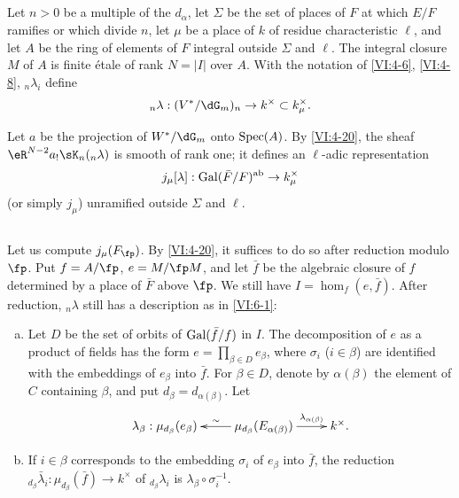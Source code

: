 \subsection{}\label{VI:6-2}

Let $n>0$ be a multiple of the $d_\alpha$, let $\Sigma$ be the set of places of $F$ 
at which $E/F$ ramifies or which divide $n$, let $\mu$ be a place of $k$ of 
residue characteristic $\ell$, and let $A$ be the ring of elements of $F$ 
integral outside $\Sigma$ and $\ell$. The integral closure $M$ of $A$ 
is finite étale of rank $N=|I|$ over $A$. With the notation of \ref{VI:4-6}, 
\ref{VI:4-8}, $_n \lambda_i$ define 
\[
  _n\lambda:(V^\ast/\dG_m)_n \to k^\times \subset k_\mu^\times \text{.} 
\]

Let $a$ be the projection of $W^\ast/\dG_m$ onto $\operatorname{Spec}(A)$. By 
\ref{VI:4-20}, the sheaf $\eR^{N-2} a_! \sK_n(_n \lambda)$ is smooth of rank 
one; it defines an $\ell$-adic representation 
\[
  j_\mu[\lambda]:\operatorname{Gal}(\bar F/F)^\text{ab} \to k_\mu^\times 
\]
  (or simply $j_\mu$) unramified outside $\Sigma$ and $\ell$. 





\subsection{}\label{VI:6-3}

Let us compute $j_\mu(F_\fp)$. By \ref{VI:4-20}, it suffices to do so 
after reduction modulo $\fp$. Put $f=A/\fp$, $e=M/\fp  M$, and let 
$\bar f$ be the algebraic closure of $f$ determined by a place of $\bar F$ 
above $\fp$. We still have $I=\hom_f(e,\bar f)$. After reduction, 
$_n\lambda$ still has a description as in \ref{VI:6-1}: 
\begin{enumerate}[a)]
  \item Let $D$ be the set of orbits of $\operatorname{Gal}(\bar f/f)$ in $I$. The 
    decomposition of $e$ as a product of fields has the form 
    $e=\prod_{\beta\in D} e_\beta$, where $\sigma_i$ ($i\in \beta$) 
    are identified with the embeddings of $e_\beta$ into $\bar f$. For $\beta\in D$, 
    denote by $\alpha(\beta)$ the element of $C$ containing $\beta$, and put 
    $d_\beta=d_{\alpha(\beta)}$. Let 
    \[\xymatrix{
      \lambda_\beta : \mu_{d_\beta}(e_\beta) 
        & \ar[l]_-\sim \mu_{d_\beta}(E_{\alpha(\beta)}) \ar[r]^-{\lambda_{\alpha(\beta)}} 
        & k^\times \text{.} 
    }\]
  \item If $i\in \beta$ corresponds to the embedding $\sigma_i$ of $e_\beta$ into 
    $\bar f$, the reduction 
    $_{d_\beta} \bar\lambda_i:\mu_{d_\beta}(\bar f) \to k^\times$ 
    of $_{d_\beta} \lambda_i$ is 
    $\lambda_\beta \circ \sigma_i^{-1}$. 
\end{enumerate}

